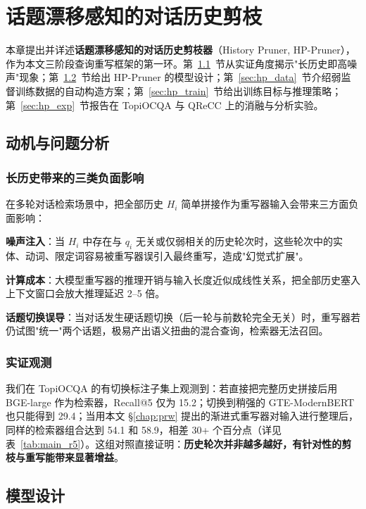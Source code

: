\chapter{话题漂移感知的对话历史剪枝}
\label{chap:hpprune}

本章提出并详述\textbf{话题漂移感知的对话历史剪枝器}（History Pruner, HP-Pruner），作为本文三阶段查询重写框架的第一环。第~\ref{sec:hp_motivation}~节从实证角度揭示"长历史即高噪声"现象；第~\ref{sec:hp_model}~节给出 HP-Pruner 的模型设计；第~\ref{sec:hp_data}~节介绍弱监督训练数据的自动构造方案；第~\ref{sec:hp_train}~节给出训练目标与推理策略；第~\ref{sec:hp_exp}~节报告在 TopiOCQA 与 QReCC 上的消融与分析实验。

\section{动机与问题分析}
\label{sec:hp_motivation}

\subsection{长历史带来的三类负面影响}

在多轮对话检索场景中，把全部历史 $H_i$ 简单拼接作为重写器输入会带来三方面负面影响：

\textbf{噪声注入}：当 $H_i$ 中存在与 $q_i$ 无关或仅弱相关的历史轮次时，这些轮次中的实体、动词、限定词容易被重写器误引入最终重写，造成"幻觉式扩展"。

\textbf{计算成本}：大模型重写器的推理开销与输入长度近似成线性关系，把全部历史塞入上下文窗口会放大推理延迟 2--5 倍。

\textbf{话题切换误导}：当对话发生硬话题切换（后一轮与前数轮完全无关）时，重写器若仍试图"统一"两个话题，极易产出语义扭曲的混合查询，检索器无法召回。

\subsection{实证观测}

我们在 TopiOCQA 的有切换标注子集上观测到：若直接把完整历史拼接后用 BGE-large 作为检索器，Recall@5 仅为 15.2；切换到稍强的 GTE-ModernBERT 也只能得到 29.4；当用本文 §\ref{chap:prw} 提出的渐进式重写器对输入进行整理后，同样的检索器组合达到 54.1 和 58.9，相差 30+ 个百分点（详见表~\ref{tab:main_r5}）。这组对照直接证明：\textbf{历史轮次并非越多越好，有针对性的剪枝与重写能带来显著增益}。

\section{模型设计}
\label{sec:hp_model}


